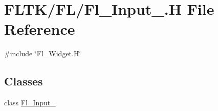 \hypertarget{_fl___input___8_h}{}\section{F\+L\+T\+K/\+F\+L/\+Fl\+\_\+\+Input\+\_\+.H File Reference}
\label{_fl___input___8_h}
{\ttfamily \#include \char`\"{}Fl\+\_\+\+Widget.\+H\char`\"{}}\newline
\subsection*{Classes}
\begin{DoxyCompactItemize}
\item 
class \hyperlink{class_fl___input__}{Fl\+\_\+\+Input\+\_\+}
\end{DoxyCompactItemize}
